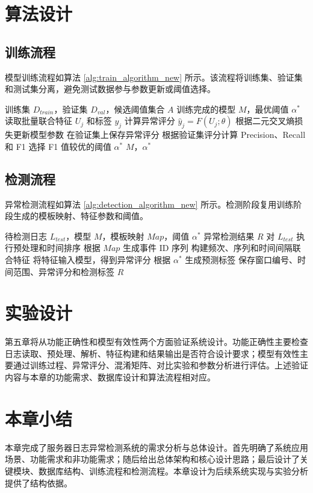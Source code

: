 \section{算法设计}

\subsection{训练流程}

模型训练流程如算法 \ref{alg:train_algorithm_new} 所示。该流程将训练集、验证集和测试集分离，避免测试数据参与参数更新或阈值选择。

\begin{algorithm}[htbp]
    \caption{Liquid 模型训练与动态阈值校准流程}
    \label{alg:train_algorithm_new}
    \begin{algorithmic}[1]
        \REQUIRE 训练集 $D_{train}$，验证集 $D_{val}$，候选阈值集合 $A$
        \ENSURE 训练完成的模型 $M$，最优阈值 $\alpha^*$
            \STATE 读取批量联合特征 $U_j$ 和标签 $y_j$
            \STATE 计算异常评分 $\hat{y}_j=F(U_j;\theta)$
            \STATE 根据二元交叉熵损失更新模型参数
            \STATE 在验证集上保存异常评分
        \ENDFOR
            \STATE 根据验证集评分计算 Precision、Recall 和 F1
        \ENDFOR
        \STATE 选择 F1 值较优的阈值 $\alpha^*$
        \RETURN $M$，$\alpha^*$
    \end{algorithmic}
\end{algorithm}

\subsection{检测流程}

异常检测流程如算法 \ref{alg:detection_algorithm_new} 所示。检测阶段复用训练阶段生成的模板映射、特征参数和阈值。

\begin{algorithm}[htbp]
    \caption{日志异常检测流程}
    \label{alg:detection_algorithm_new}
    \begin{algorithmic}[1]
        \REQUIRE 待检测日志 $L_{test}$，模型 $M$，模板映射 $Map$，阈值 $\alpha^*$
        \ENSURE 异常检测结果 $R$
        \STATE 对 $L_{test}$ 执行预处理和时间排序
        \STATE 根据 $Map$ 生成事件 ID 序列
        \STATE 构建频次、序列和时间间隔联合特征
        \STATE 将特征输入模型，得到异常评分
        \STATE 根据 $\alpha^*$ 生成预测标签
        \STATE 保存窗口编号、时间范围、异常评分和检测标签
        \RETURN $R$
    \end{algorithmic}
\end{algorithm}

\section{实验设计}

第五章将从功能正确性和模型有效性两个方面验证系统设计。功能正确性主要检查日志读取、预处理、解析、特征构建和结果输出是否符合设计要求；模型有效性主要通过训练过程、异常评分、混淆矩阵、对比实验和参数分析进行评估。上述验证内容与本章的功能需求、数据库设计和算法流程相对应。

\section{本章小结}

本章完成了服务器日志异常检测系统的需求分析与总体设计。首先明确了系统应用场景、功能需求和非功能需求；随后给出总体架构和核心设计思路；最后设计了关键模块、数据库结构、训练流程和检测流程。本章设计为后续系统实现与实验分析提供了结构依据。
